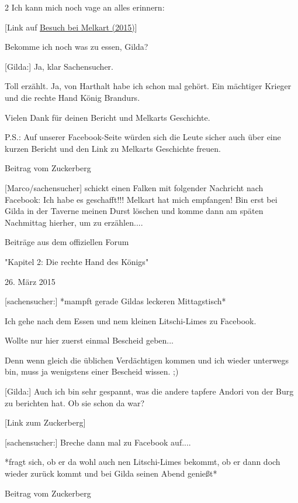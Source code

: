 \documentclass[10pt, a4paper, oneside]{book}
\begin{document}
\begin{multicols}{2}
Ich kann mich noch vage an alles erinnern:

[Link auf \hyperref[storytext-2015-besuch-bei-melkart]{Besuch bei Melkart (2015)}]

Bekomme ich noch was zu essen, Gilda?

[Gilda:] Ja, klar Sachensucher.

Toll erzählt. Ja, von Harthalt habe ich schon mal gehört. Ein mächtiger Krieger und die rechte Hand König Brandurs.

Vielen Dank für deinen Bericht und Melkarts Geschichte.

P.S.: Auf unserer Facebook-Seite würden sich die Leute sicher auch über eine kurzen Bericht und den Link zu Melkarts Geschichte freuen.

\begin{center}
    Beitrag vom Zuckerberg
\end{center}

[Marco/sachensucher] schickt einen Falken mit folgender Nachricht nach Facebook: Ich habe es geschafft!!! Melkart hat mich empfangen! Bin erst bei Gilda in der Taverne meinen Durst löschen und komme dann am späten Nachmittag hierher, um zu erzählen.... 

\begin{center}
    Beiträge aus dem offiziellen Forum

    "Kapitel 2: Die rechte Hand des Königs"

    26. März 2015
\end{center}

[sachensucher:] *mampft gerade Gildas leckeren Mittagstisch*

Ich gehe nach dem Essen und nem kleinen Litschi-Limes zu Facebook.

Wollte nur hier zuerst einmal Bescheid geben...

Denn wenn gleich die üblichen Verdächtigen kommen und ich wieder unterwegs bin, muss ja wenigstens einer Bescheid wissen. ;) 

[Gilda:] Auch ich bin sehr gespannt, was die andere tapfere Andori von der Burg zu berichten hat. Ob sie schon da war?

[Link zum Zuckerberg]

[sachensucher:] Breche dann mal zu Facebook auf....

*fragt sich, ob er da wohl auch nen Litschi-Limes bekommt, ob er dann doch wieder zurück kommt und bei Gilda seinen Abend genießt*

\begin{center}
    Beitrag vom Zuckerberg
\end{center}


\end{multicols}
\end{document}
